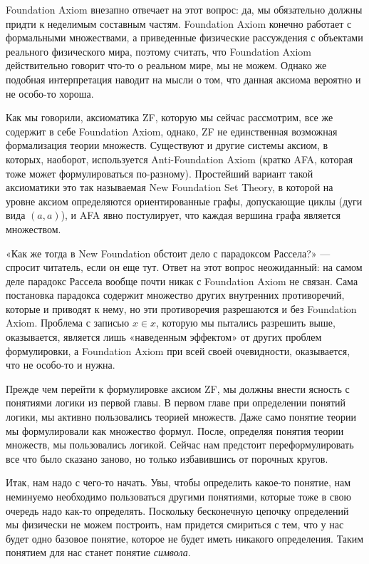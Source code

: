Foundation Axiom внезапно отвечает на этот вопрос: да, мы обязательно должны придти к неделимым составным частям. Foundation Axiom конечно работает с формальными множествами, а приведенные физические рассуждения с объектами реального физического мира, поэтому считать, что Foundation Axiom действительно говорит что-то о реальном мире, мы не можем. Однако же подобная интерпретация наводит на мысли о том, что данная аксиома вероятно и не особо-то хороша.

Как мы говорили, аксиоматика ZF, которую мы сейчас рассмотрим, все же содержит в себе Foundation Axiom, однако, ZF не единственная возможная формализация теории множеств. Существуют и другие системы аксиом, в которых, наоборот, используется Anti-Foundation Axiom (кратко AFA, которая тоже может формулироваться по-разному). Простейший вариант такой аксиоматики это так называемая New Foundation Set Theory, в которой на уровне аксиом определяются ориентированные графы, допускающие циклы (дуги вида $(a, a)$), и AFA явно постулирует, что каждая вершина графа является множеством.

«Как же тогда в New Foundation обстоит дело с парадоксом Рассела?» — спросит читатель, если он еще тут. Ответ на этот вопрос неожиданный: на самом деле парадокс Рассела вообще почти никак с Foundation Axiom не связан. Сама постановка парадокса содержит множество других внутренних противоречий, которые и приводят к нему, но эти противоречия разрешаются и без Foundation Axiom. Проблема с записью $x\in x$, которую мы пытались разрешить выше, оказывается, является лишь «наведенным эффектом» от других проблем формулировки, а Foundation Axiom при всей своей очевидности, оказывается, что не особо-то и нужна.

Прежде чем перейти к формулировке аксиом ZF, мы должны внести ясность с понятиями логики из первой главы. В первом главе при определении понятий логики, мы активно пользовались теорией множеств. Даже само понятие теории мы формулировали как множество формул. После, определяя понятия теории множеств, мы пользовались логикой. Сейчас нам предстоит переформулировать все что было сказано заново, но только избавившись от порочных кругов.

Итак, нам надо с чего-то начать. Увы, чтобы определить какое-то понятие, нам неминуемо необходимо пользоваться другими понятиями, которые тоже в свою очередь надо как-то определять. Поскольку бесконечную цепочку определений мы физически не можем построить, нам придется смириться с тем, что у нас будет одно базовое понятие, которое не будет иметь никакого определения. Таким понятием для нас станет понятие {\slshape символа}.

